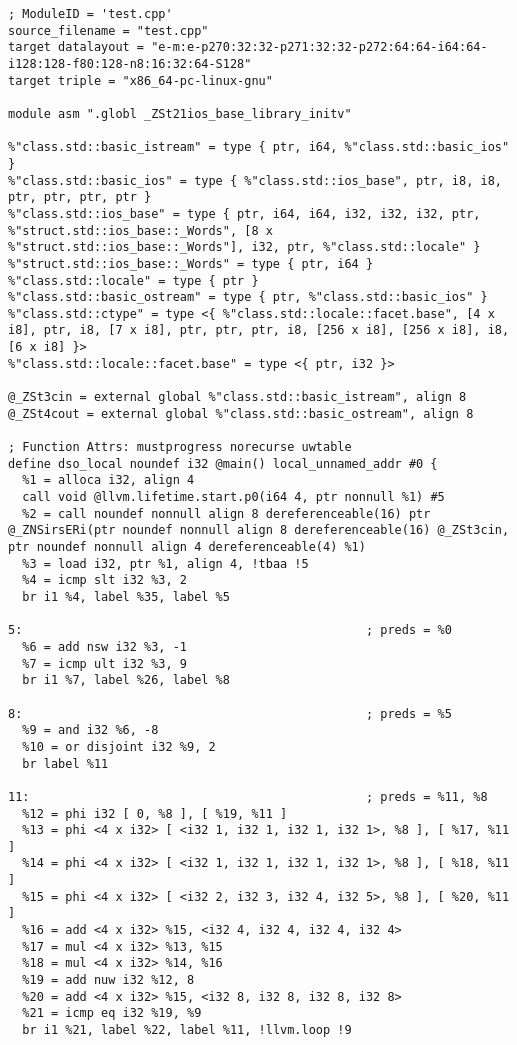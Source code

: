 \documentclass[UTF8,a4paper,10pt]{ctexart}
\begin{document}
\begin{lstlisting}[title=O2优化,frame=trbl]
; ModuleID = 'test.cpp'
source_filename = "test.cpp"
target datalayout = "e-m:e-p270:32:32-p271:32:32-p272:64:64-i64:64-i128:128-f80:128-n8:16:32:64-S128"
target triple = "x86_64-pc-linux-gnu"

module asm ".globl _ZSt21ios_base_library_initv"

%"class.std::basic_istream" = type { ptr, i64, %"class.std::basic_ios" }
%"class.std::basic_ios" = type { %"class.std::ios_base", ptr, i8, i8, ptr, ptr, ptr, ptr }
%"class.std::ios_base" = type { ptr, i64, i64, i32, i32, i32, ptr, %"struct.std::ios_base::_Words", [8 x %"struct.std::ios_base::_Words"], i32, ptr, %"class.std::locale" }
%"struct.std::ios_base::_Words" = type { ptr, i64 }
%"class.std::locale" = type { ptr }
%"class.std::basic_ostream" = type { ptr, %"class.std::basic_ios" }
%"class.std::ctype" = type <{ %"class.std::locale::facet.base", [4 x i8], ptr, i8, [7 x i8], ptr, ptr, ptr, i8, [256 x i8], [256 x i8], i8, [6 x i8] }>
%"class.std::locale::facet.base" = type <{ ptr, i32 }>

@_ZSt3cin = external global %"class.std::basic_istream", align 8
@_ZSt4cout = external global %"class.std::basic_ostream", align 8

; Function Attrs: mustprogress norecurse uwtable
define dso_local noundef i32 @main() local_unnamed_addr #0 {
  %1 = alloca i32, align 4
  call void @llvm.lifetime.start.p0(i64 4, ptr nonnull %1) #5
  %2 = call noundef nonnull align 8 dereferenceable(16) ptr @_ZNSirsERi(ptr noundef nonnull align 8 dereferenceable(16) @_ZSt3cin, ptr noundef nonnull align 4 dereferenceable(4) %1)
  %3 = load i32, ptr %1, align 4, !tbaa !5
  %4 = icmp slt i32 %3, 2
  br i1 %4, label %35, label %5

5:                                                ; preds = %0
  %6 = add nsw i32 %3, -1
  %7 = icmp ult i32 %3, 9
  br i1 %7, label %26, label %8

8:                                                ; preds = %5
  %9 = and i32 %6, -8
  %10 = or disjoint i32 %9, 2
  br label %11

11:                                               ; preds = %11, %8
  %12 = phi i32 [ 0, %8 ], [ %19, %11 ]
  %13 = phi <4 x i32> [ <i32 1, i32 1, i32 1, i32 1>, %8 ], [ %17, %11 ]
  %14 = phi <4 x i32> [ <i32 1, i32 1, i32 1, i32 1>, %8 ], [ %18, %11 ]
  %15 = phi <4 x i32> [ <i32 2, i32 3, i32 4, i32 5>, %8 ], [ %20, %11 ]
  %16 = add <4 x i32> %15, <i32 4, i32 4, i32 4, i32 4>
  %17 = mul <4 x i32> %13, %15
  %18 = mul <4 x i32> %14, %16
  %19 = add nuw i32 %12, 8
  %20 = add <4 x i32> %15, <i32 8, i32 8, i32 8, i32 8>
  %21 = icmp eq i32 %19, %9
  br i1 %21, label %22, label %11, !llvm.loop !9


\end{lstlisting}
\end{document}
